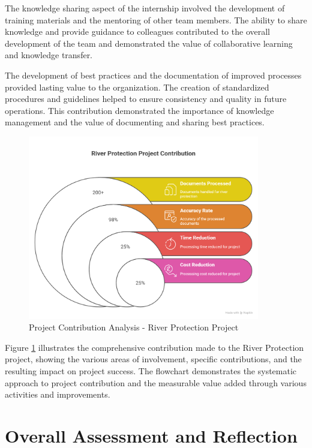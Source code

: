 The knowledge sharing aspect of the internship involved the development of training materials and the mentoring of other team members. The ability to share knowledge and provide guidance to colleagues contributed to the overall development of the team and demonstrated the value of collaborative learning and knowledge transfer.

The development of best practices and the documentation of improved processes provided lasting value to the organization. The creation of standardized procedures and guidelines helped to ensure consistency and quality in future operations. This contribution demonstrated the importance of knowledge management and the value of documenting and sharing best practices.

\begin{figure}[H]
    \centering
    \includegraphics[width=0.9\textwidth]{assets/images/project_contribution_chart.png}
    \caption{Project Contribution Analysis - River Protection Project}
    \label{fig:project_contribution_chart}
\end{figure}

Figure \ref{fig:project_contribution_chart} illustrates the comprehensive contribution made to the River Protection project, showing the various areas of involvement, specific contributions, and the resulting impact on project success. The flowchart demonstrates the systematic approach to project contribution and the measurable value added through various activities and improvements.

\section{Overall Assessment and Reflection}

